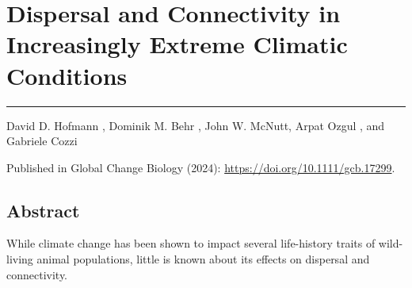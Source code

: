 \documentclass[../FinalThesis.tex]{subfiles}
\begin{document}
\chapter{Dispersal and Connectivity in Increasingly Extreme Climatic Conditions}
\label{ChapterFlood}
\thispagestyle{empty}
\vspace{-1cm}
\noindent\hfil\rule{0.75\textwidth}{.4pt}\hfil

\begin{center}
David D. Hofmann ,
Dominik M. Behr ,
John W. McNutt,
Arpat Ozgul , and
Gabriele Cozzi 


\vfill

Published in Global Change Biology (2024):
\url{https://doi.org/10.1111/gcb.17299}.

%
%
%
%

\end{center}


%
%


\newpage
\section*{Abstract}
While climate change has been shown to impact several life-history traits of
wild-living animal populations, little is known about its effects on dispersal
and connectivity.
\end{document}
